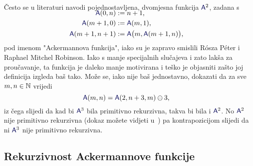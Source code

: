 \begin{napomena}
Često se u literaturi navodi pojednostavljena, dvomjesna funkcija $\f A^2$, zadana s
\begin{align}
\SwapAboveDisplaySkip
    \f A(0,n)&:=n+1\text,\\
    \f A(m+1,0)&:=\f A(m,1)\text,\\
    \f A(m+1,n+1)&:=\f A\bigl(m,\f A(m+1,n)\bigr)\text,
\end{align}
pod imenom "Ackermannova funkcija", iako su je zapravo smislili R\'osza P\'eter i Raphael Mitchel Robinson. Iako s manje specijalnih slučajeva i zato lakša za proučavanje, ta funkcija je daleko manje motivirana i teško je objasniti zašto joj definicija izgleda baš tako. Može se, iako nije baš jednostavno, dokazati da za sve $m,n\in{\mathbb N}$ vrijedi
\begin{equation}
    \f A(m,n)=\f A(2,n+3,m)\ominus3\text,
\end{equation}
iz čega slijedi da kad bi $\f A^3$ bila primitivno rekurzivna, takva bi bila i $\f A^2$. No $\f A^2$ nije primitivno rekurzivna (dokaz možete vidjeti u~\cite{skr:Vuk}) pa kontrapozicijom slijedi da ni $\f A^3$ nije primitivno rekurzivna.
\end{napomena}

\subsection{Rekurzivnost Ackermannove funkcije}

